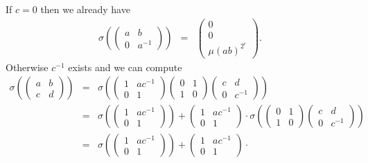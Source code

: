 If $c=0$ then we already have
\begin{eqnarray*}
\sigma\left(
\left(\begin{matrix}a & b \\ 0 & a^{-1}\end{matrix}\right)
\right)
&=&
\left(\begin{matrix}0 \\ 0 \\ \mu(ab)^{2^r}\end{matrix}\right).
\end{eqnarray*}
Otherwise $c^{-1}$ exists and we can compute
\begin{eqnarray*}
\sigma\left(
\left(\begin{matrix}a & b \\ c & d\end{matrix}\right)
\right) &=&
\sigma\left(
	\left(\begin{matrix} 1 & ac^{-1} \\ 0 & 1 \end{matrix}\right)
	\left(\begin{matrix} 0 & 1 \\ 1 & 0 \end{matrix}\right)
	\left(\begin{matrix} c & d \\ 0 & c^{-1} \end{matrix}\right)
\right) \\
&=&
\sigma\left(
	\left(\begin{matrix} 1 & ac^{-1} \\ 0 & 1 \end{matrix}\right)
\right) + 
\left(\begin{matrix} 1 & ac^{-1} \\ 0 & 1 \end{matrix}\right)\cdot
\sigma\left(
	\left(\begin{matrix} 0 & 1 \\ 1 & 0 \end{matrix}\right)
	\left(\begin{matrix} c & d \\ 0 & c^{-1} \end{matrix}\right)
\right) \\
&=&
\sigma\left(
	\left(\begin{matrix} 1 & ac^{-1} \\ 0 & 1 \end{matrix}\right)
\right) + 
\left(\begin{matrix} 1 & ac^{-1} \\ 0 & 1 \end{matrix}\right)\cdot

\end{eqnarray*}
